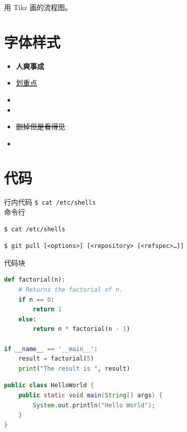 \documentclass{cls/simplereport}
\begin{document}
用 Tikz 画的流程图。



\section{字体样式}

\begin{itemize}
	\item \textbf{人爽事成}
	\item \uline{划重点}
	\item {} 
	\item {}
	\item \sout{删掉但是看得见}　
	\item {} 
\end{itemize}

\section{代码}

\noindent 行内代码 \lstinline{$ cat /etc/shells} \\

\noindent 命令行
\begin{lstlisting}[language=Bash]
$ cat /etc/shells
\end{lstlisting}

\begin{lstlisting}
$ git pull [<options>] [<repository> [<refspec>…​]]
\end{lstlisting}

\vspace*{2ex}

\noindent 代码块

\begin{lstlisting}[language=Python, caption={Python 示例}]
def factorial(n):  
    # Returns the factorial of n. 
    if n == 0:
        return 1
    else:
        return n * factorial(n - 1)

if __name__ == '__main__':
    result = factorial(5)
    print("The result is ", result)
\end{lstlisting}


\begin{lstlisting}[language=Java, caption={Java 示例}]
public class HelloWorld {
    public static void main(String[] args) {
        System.out.println("Hello World");
    }
}
\end{lstlisting}
\end{document}
